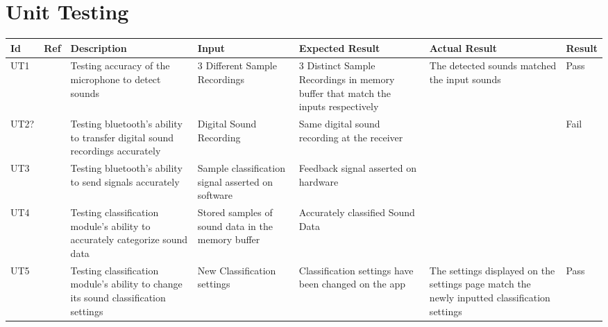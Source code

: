 \documentclass[12pt, titlepage]{article}
\begin{document}
\section{Unit Testing}
\begin{longtable}{|p{1.1cm}|p{1cm}|p{3cm}|p{1.5cm}|p{2.5cm}|p{2cm}|p{1.2cm}|}
  \hline
  \textbf{Id} & \textbf{Ref} & \textbf{Description}                                                         & \textbf{Input}                                    & \textbf{Expected Result}                                    & \textbf{Actual Result} & \textbf{Result}                                    \\ \hline
  UT1       &      & Testing accuracy of the microphone to detect sounds                                      & 3 Different Sample Recordings                             & 3 Distinct Sample Recordings in memory buffer that match the inputs respectively                    &     The detected sounds matched the input sounds                    & {\color[HTML]{32CB00} Pass} \\ \hline
  UT2?      &      & Testing bluetooth's ability to transfer digital sound recordings accurately                                         & Digital Sound Recording              & Same digital sound recording at the receiver                            &                        & {\color[HTML]{FE0000} Fail}                        \\ \hline
  UT3       &      & Testing bluetooth's ability to send signals accurately                                                  & Sample classification signal asserted on software                 & Feedback signal asserted on hardware                        &                        & \cellcolor[HTML]{FFFFFF}{\color[HTML]{F8A102} TBD} \\ \hline
  UT4       &      & Testing classification module's ability to accurately categorize sound data  & Stored samples of sound data in the memory buffer              & Accurately classified Sound Data                          &                        &                                                    \\ \hline
  UT5       &      & Testing classification module's ability to change its sound classification settings                                      & New Classification settings                                  & Classification settings have been changed on the app                    &       The settings displayed on the settings page match the newly inputted classification settings                 &       {\color[HTML]{32CB00} Pass}                                             \\ \hline

\end{longtable}
\end{document}

